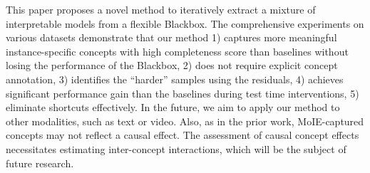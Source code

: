 

This paper proposes a novel method to iteratively extract a mixture of interpretable models from a flexible Blackbox. The comprehensive experiments on various datasets demonstrate that our method 1) captures more meaningful instance-specific concepts with high completeness score than baselines without losing the performance of the Blackbox, 2) does not require explicit concept annotation, 3) identifies the ``harder'' samples using the residuals, 4) achieves significant performance gain than the baselines during test time interventions, 5) eliminate shortcuts effectively. In the future, we aim to apply our method to other modalities, such as text or video. Also, as in the prior work, MoIE-captured concepts may not reflect a causal effect. The assessment of causal concept effects necessitates estimating inter-concept interactions, which will be the subject of future research.